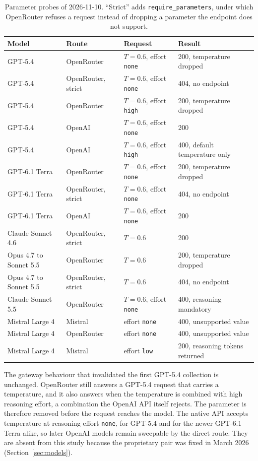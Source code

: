 \begin{table}[h]
  \centering
  \small
  \begin{tabular}{llll}
    \toprule
    Model & Route & Request & Result \\
    \midrule
    GPT-5.4 & OpenRouter & $T{=}0.6$, effort \texttt{none} & 200, temperature dropped \\
    GPT-5.4 & OpenRouter, strict & $T{=}0.6$, effort \texttt{none} & 404, no endpoint \\
    GPT-5.4 & OpenRouter & $T{=}0.6$, effort \texttt{high} & 200, temperature dropped \\
    GPT-5.4 & OpenAI & $T{=}0.6$, effort \texttt{none} & 200 \\
    GPT-5.4 & OpenAI & $T{=}0.6$, effort \texttt{high} & 400, default temperature only \\
    GPT-6.1 Terra & OpenRouter & $T{=}0.6$, effort \texttt{none} & 200, temperature dropped \\
    GPT-6.1 Terra & OpenRouter, strict & $T{=}0.6$, effort \texttt{none} & 404, no endpoint \\
    GPT-6.1 Terra & OpenAI & $T{=}0.6$, effort \texttt{none} & 200 \\
    Claude Sonnet 4.6 & OpenRouter, strict & $T{=}0.6$ & 200 \\
    Opus 4.7 to Sonnet 5.5 & OpenRouter & $T{=}0.6$ & 200, temperature dropped \\
    Opus 4.7 to Sonnet 5.5 & OpenRouter, strict & $T{=}0.6$ & 404, no endpoint \\
    Claude Sonnet 5.5 & OpenRouter & $T{=}0.6$, effort \texttt{none} & 400, reasoning mandatory \\
    Mistral Large 4 & Mistral & effort \texttt{none} & 400, unsupported value \\
    Mistral Large 4 & OpenRouter & effort \texttt{none} & 400, unsupported value \\
    Mistral Large 4 & Mistral & effort \texttt{low} & 200, reasoning tokens returned \\
    \bottomrule
  \end{tabular}
  \caption{Parameter probes of 2026-11-10. ``Strict'' adds \texttt{require\_parameters}, under which OpenRouter refuses a request instead of dropping a parameter the endpoint does not support.}
  \label{tab:excluded}
\end{table}

The gateway behaviour that invalidated the first GPT-5.4 collection is unchanged. OpenRouter still answers a GPT-5.4 request that carries a temperature, and it also answers when the temperature is combined with high reasoning effort, a combination the OpenAI API itself rejects. The parameter is therefore removed before the request reaches the model. The native API accepts temperature at reasoning effort \texttt{none}, for GPT-5.4 and for the newer GPT-6.1 Terra alike, so later OpenAI models remain sweepable by the direct route. They are absent from this study because the proprietary pair was fixed in March 2026 (Section~\ref{sec:models}).

